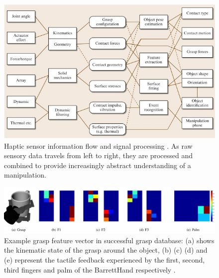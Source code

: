 
\begin{figure}[hbt]
	\centering
	\includegraphics[width=\linewidth]{images/touch_id}
	\caption{Haptic sensor information flow and signal processing \cite{cutkosky2008force}.
As raw sensory data travels from left to right, they are processed and combined to provide increasingly abstract understanding of a manipulation.}
	\label{fig:touch_id}
\end{figure}

\begin{figure}[hbt]
	\centering
	\includegraphics[width=\linewidth]{images/grasp_tactile_example}
	\caption{Example grasp feature vector in successful grasp database: (a) shows the kinematic state of the grasp around the object, (b) (c) (d) and (e) represent the tactile feedback experienced by the first, second, third fingers and palm of the BarrettHand respectively \cite{dang2011blind}.}
	\label{fig:tact_example}
\end{figure}

